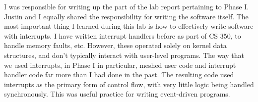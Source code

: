 \documentclass[12pt]{article}
\begin{document}
I was responsible for writing up the part of the lab report pertaining to Phase I.
Justin and I equally shared the responsibility for writing the software itself.
The most important thing I learned during this lab is how to effectively write
software with interrupts.
I have written interrupt handlers before as part of CS 350, to handle memory
faults, etc.
However, these operated solely on kernel data structures, and don't typically
interact with user-level programs.
The way that we used interrupts, in Phase I in particular, meshed user code and
interrupt handler code far more than I had done in the past.
The resulting code used interrupts as the primary form of control flow, with
very little logic being handled synchronously.
This was useful practice for writing event-driven programs.
\end{document}
